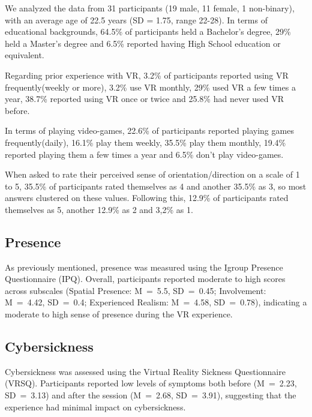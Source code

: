 We analyzed the data from 31 participants (19 male, 11 female, 1 non-binary), with an average age of 22.5 years (SD = 1.75, range 22-28). In terms of educational backgrounds, 64.5\% of participants held a Bachelor's degree, 29\% held a Master’s degree and 6.5\% reported having High School education or equivalent.

Regarding prior experience with \gls{VR}, 3.2\% of participants reported using \gls{VR} frequently(weekly or more), 3.2\% use \gls{VR} monthly, 29\% used \gls{VR} a few times a year, 38.7\% reported using \gls{VR} once or twice and 25.8\% had never used \gls{VR} before.

In terms of playing video-games, 22.6\% of participants reported playing games frequently(daily), 16.1\% play them weekly, 35.5\% play them monthly, 19.4\% reported playing them a few times a year and 6.5\% don't play video-games.

When asked to rate their perceived sense of orientation/direction on a scale of 1 to 5, 35.5\% of participants rated themselves as 4 and another 35.5\% as 3, so most answers clustered on these values. Following this, 12.9\% of participants rated themselves as 5, another 12.9\% as 2 and 3,2\% as 1.


\subsection{Presence}
\label{sec:presence}

As previously mentioned, presence was measured using the Igroup Presence Questionnaire (IPQ). 
Overall, participants reported moderate to high scores across subscales (Spatial Presence: M~=~5.5, SD~=~0.45; 
Involvement: M~=~4.42, SD~=~0.4; Experienced Realism: M~=~4.58, SD~=~0.78), indicating a moderate to high sense of 
presence during the \gls{VR} experience. 

\subsection{Cybersickness}
\label{sec:cybersickness}
Cybersickness was assessed using the Virtual Reality Sickness Questionnaire (VRSQ). 
Participants reported low levels of symptoms both before (M~=~2.23, SD~=~3.13) and after the session (M~=~2.68, SD~=~3.91),
suggesting that the experience had minimal impact on cybersickness.


